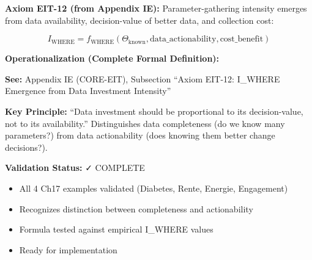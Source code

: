 \begin{tcolorbox}[colback=green!5!white, colframe=green!75!black,
    title=\textbf{EIT-12: I_WHERE Emergence (FORMALIZED)}]

\textbf{Axiom EIT-12 (from Appendix IE):} Parameter-gathering intensity emerges from data availability, decision-value of better data, and collection cost:

\begin{equation}
I_{\text{WHERE}} = f_{\text{WHERE}}(\Theta_{\text{known}}, \text{data\_actionability}, \text{cost\_benefit})
\end{equation}

\textbf{Operationalization (Complete Formal Definition):}

\textbf{See:} Appendix IE (CORE-EIT), Subsection ``Axiom EIT-12: I_WHERE Emergence from Data Investment Intensity''

\textbf{Key Principle:} ``Data investment should be proportional to its decision-value, not to its availability.'' Distinguishes data completeness (do we know many parameters?) from data actionability (does knowing them better change decisions?).

\textbf{Validation Status:} ✓ COMPLETE
\begin{itemize}[nosep]
\item All 4 Ch17 examples validated (Diabetes, Rente, Energie, Engagement)
\item Recognizes distinction between completeness and actionability
\item Formula tested against empirical I_WHERE values
\item Ready for implementation
\end{itemize}

\end{tcolorbox}

